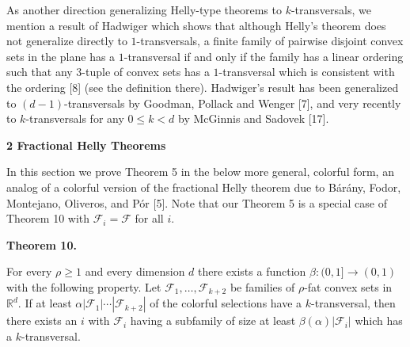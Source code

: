 \par
\par
As another direction generalizing Helly-type theorems to $k$-transversals, we mention a result of Hadwiger which shows that although Helly’s theorem does not generalize directly to $1$-transversals, a finite family of pairwise disjoint convex sets in the plane has a $1$-transversal if and only if the family has a linear ordering such that any $3$-tuple of convex sets has a $1$-transversal which is consistent with the ordering [8] (see the definition there). Hadwiger’s result has been generalized to $(d-1)$-transversals by Goodman, Pollack and Wenger [7], and very recently to $k$-transversals for any $0\leq k<d$ by McGinnis and Sadovek [17].
\par
\par
\par\medskip\noindent\textbf{2 Fractional Helly Theorems}\par
In this section we prove Theorem 5 in the below more general, colorful form, an analog of a colorful version of the fractional Helly theorem due to Bárány, Fodor, Montejano, Oliveros, and Pór [5]. Note that our Theorem 5 is a special case of Theorem 10 with $\mathcal{F}_{i}=\mathcal{F}$ for all $i$.
\par
\par
\par\medskip\noindent\textbf{Theorem 10.}\par
For every $\rho\geq 1$ and every dimension $d$ there exists a function $\beta:(0,1]\to(0,1)$ with the following property. Let $\mathcal{F}_{1},\ldots,\mathcal{F}_{k+2}$ be families of $\rho$-fat convex sets in $\mathbb{R}^{d}$. If at least $\alpha|\mathcal{F}_{1}|\cdots|\mathcal{F}_{k+2}|$ of the colorful selections have a $k$-transversal, then there exists an $i$ with $\mathcal{F}_{i}$ having a subfamily of size at least $\beta(\alpha)|\mathcal{F}_{i}|$ which has a $k$-transversal.
\par
\par
\par
